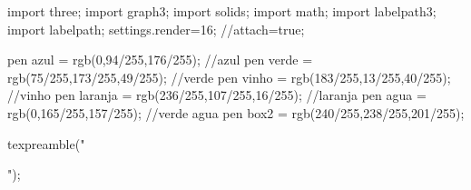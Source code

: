 \RequirePackage{tikzpagenodes}

\RequirePackage{environ}


\begin{asydef}
import three;
import graph3;
import solids;
import math;
import labelpath3;
import labelpath;
settings.render=16;
//attach=true;

pen azul = rgb(0,94/255,176/255); //azul
pen verde = rgb(75/255,173/255,49/255); //verde
pen vinho = rgb(183/255,13/255,40/255); //vinho
pen laranja = rgb(236/255,107/255,16/255); //laranja
pen agua = rgb(0,165/255,157/255); //verde agua
pen box2 = rgb(240/255,238/255,201/255);


texpreamble("\usepackage{fontspec}\setmainfont{Exo2-Light}");
\end{asydef}


\def\asydir{asytmp-perspectiva2}



%
%


\RequirePackage{soul}


\newlength\srotate@axis
\newlength\srotate@width
\DeclareRobustCommand*{\srotate}{%
  \SOUL@setup
  \let\SOUL@everyhyphen\srotate@everyhyphen
  \let\SOUL@everyexhyphen\srotate@everyexhyphen
  \let\SOUL@everytoken\srotate@everytoken
  \settoheight\srotate@axis{$\vcenter{}$}%
  \settoheight\srotate@width{\raisebox{\depth}{XQ}}%
  \SOUL@
}
\newcommand*{\srotate@everytoken}{%
  \srotate@token{\the\SOUL@token}%
}
\newcommand*{\srotate@everyexhyphen}[1]{%
  \srotate@token{\raisebox{\srotate@axis}[.1ex][.1ex]{#1}}%
}
\newcommand*{\srotate@everyhyphen}{%
  \discretionary{%
    \srotate@everyexhyphen{-}%
  }{}{}%
}
\newcommand*{\srotate@token}[1]{%
  \kern.02ex
  \hbox to \srotate@width{%
    \hfil
    \raisebox{\srotate@axis}{\rotatebox[origin=B]{90}{#1}}%
    \hfil
  }%
  \kern.1ex
}



